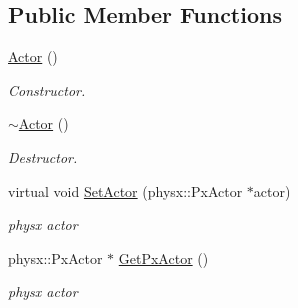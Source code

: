 \subsection*{Public Member Functions}
\begin{DoxyCompactItemize}
\item 
\hypertarget{classContent_1_1Actor_1_1Physics_1_1PhysX_1_1Actor_a4b37905ae3edc362c46e28ed017c12a1}{
\hyperlink{classContent_1_1Actor_1_1Physics_1_1PhysX_1_1Actor_a4b37905ae3edc362c46e28ed017c12a1}{Actor} ()}
\label{classContent_1_1Actor_1_1Physics_1_1PhysX_1_1Actor_a4b37905ae3edc362c46e28ed017c12a1}

\begin{DoxyCompactList}\small\item\em Constructor. \item\end{DoxyCompactList}\item 
\hypertarget{classContent_1_1Actor_1_1Physics_1_1PhysX_1_1Actor_a92aa2c06957f0660d1c6e51f64f96023}{
\hyperlink{classContent_1_1Actor_1_1Physics_1_1PhysX_1_1Actor_a92aa2c06957f0660d1c6e51f64f96023}{$\sim$Actor} ()}
\label{classContent_1_1Actor_1_1Physics_1_1PhysX_1_1Actor_a92aa2c06957f0660d1c6e51f64f96023}

\begin{DoxyCompactList}\small\item\em Destructor. \item\end{DoxyCompactList}\item 
\hypertarget{classContent_1_1Actor_1_1Physics_1_1PhysX_1_1Actor_a09b80b8138fad481ee015d6987e16752}{
virtual void \hyperlink{classContent_1_1Actor_1_1Physics_1_1PhysX_1_1Actor_a09b80b8138fad481ee015d6987e16752}{SetActor} (physx::PxActor $\ast$actor)}
\label{classContent_1_1Actor_1_1Physics_1_1PhysX_1_1Actor_a09b80b8138fad481ee015d6987e16752}

\begin{DoxyCompactList}\small\item\em physx actor \item\end{DoxyCompactList}\item 
\hypertarget{classContent_1_1Actor_1_1Physics_1_1PhysX_1_1Actor_ac0fdd75fb6a3bd5901a41560e76418e0}{
physx::PxActor $\ast$ \hyperlink{classContent_1_1Actor_1_1Physics_1_1PhysX_1_1Actor_ac0fdd75fb6a3bd5901a41560e76418e0}{GetPxActor} ()}
\label{classContent_1_1Actor_1_1Physics_1_1PhysX_1_1Actor_ac0fdd75fb6a3bd5901a41560e76418e0}

\begin{DoxyCompactList}\small\item\em physx actor \item\end{DoxyCompactList}\end{DoxyCompactItemize}
